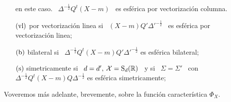 \begin{definicion}
\begin{itemize}
{      en este caso.  \label{Foot:MP:EDvc}}  \ $\Delta^{-\frac12} Q^t (X-m)$ \ es
    esf\'erica por vectorizaci\'on columna.
  \item[$(\mathrm{vl})$] por vectorizaci\'on linea  si \ $(X-m) Q' \Delta'^{-\frac12}$
    \ es esf\'erica por vectorizaci\'on linea;
  \item[$(\mathrm{b})$]   bilateral    si   \   $\Delta^{-\frac12}    Q^t   (X-m)   Q'
    \Delta'^{-\frac12}$ es esf\'erica bilateral;
  \item[$(\mathrm{s})$] simetricamente si \ $d = d', \: \mathcal{X} = \mathrm{S}_d(\mathbb{R})$ \ y si \
    $\Sigma = \Sigma'$ \ con \ $\Delta^{-\frac12} Q^t (X-m) Q \Delta^{-\frac12}$
    es esf\'erica simetricamente;
  \end{itemize}
\end{definicion}

Voveremos  m\'as  adelante,  brevemente,  sobre  la  funci\'on  caracter\'istica
$\Phi_X$.

